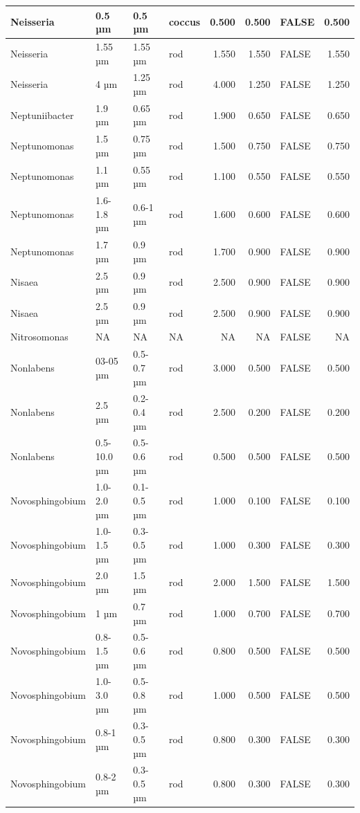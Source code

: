 \documentclass[
]{article}
\begin{document}
\begin{table}
\begin{tabular}{l|l|l|l|r|r|l|r}
\hline
Neisseria & 0.5 µm & 0.5 µm & coccus & 0.500 & 0.500 & FALSE & 0.500\\
\hline
Neisseria & 1.55 µm & 1.55 µm & rod & 1.550 & 1.550 & FALSE & 1.550\\
\hline
Neisseria & 4 µm & 1.25 µm & rod & 4.000 & 1.250 & FALSE & 1.250\\
\hline
Neptuniibacter & 1.9 µm & 0.65 µm & rod & 1.900 & 0.650 & FALSE & 0.650\\
\hline
Neptunomonas & 1.5 µm & 0.75 µm & rod & 1.500 & 0.750 & FALSE & 0.750\\
\hline
Neptunomonas & 1.1 µm & 0.55 µm & rod & 1.100 & 0.550 & FALSE & 0.550\\
\hline
Neptunomonas & 1.6-1.8 µm & 0.6-1 µm & rod & 1.600 & 0.600 & FALSE & 0.600\\
\hline
Neptunomonas & 1.7 µm & 0.9 µm & rod & 1.700 & 0.900 & FALSE & 0.900\\
\hline
Nisaea & 2.5 µm & 0.9 µm & rod & 2.500 & 0.900 & FALSE & 0.900\\
\hline
Nisaea & 2.5 µm & 0.9 µm & rod & 2.500 & 0.900 & FALSE & 0.900\\
\hline
Nitrosomonas & NA & NA & NA & NA & NA & FALSE & NA\\
\hline
Nonlabens & 03-05 µm & 0.5-0.7 µm & rod & 3.000 & 0.500 & FALSE & 0.500\\
\hline
Nonlabens & 2.5 µm & 0.2-0.4 µm & rod & 2.500 & 0.200 & FALSE & 0.200\\
\hline
Nonlabens & 0.5-10.0 µm & 0.5-0.6 µm & rod & 0.500 & 0.500 & FALSE & 0.500\\
\hline
Novosphingobium & 1.0-2.0 µm & 0.1-0.5 µm & rod & 1.000 & 0.100 & FALSE & 0.100\\
\hline
Novosphingobium & 1.0-1.5 µm & 0.3-0.5 µm & rod & 1.000 & 0.300 & FALSE & 0.300\\
\hline
Novosphingobium & 2.0 µm & 1.5 µm & rod & 2.000 & 1.500 & FALSE & 1.500\\
\hline
Novosphingobium & 1 µm & 0.7 µm & rod & 1.000 & 0.700 & FALSE & 0.700\\
\hline
Novosphingobium & 0.8-1.5 µm & 0.5-0.6 µm & rod & 0.800 & 0.500 & FALSE & 0.500\\
\hline
Novosphingobium & 1.0-3.0 µm & 0.5-0.8 µm & rod & 1.000 & 0.500 & FALSE & 0.500\\
\hline
Novosphingobium & 0.8-1 µm & 0.3-0.5 µm & rod & 0.800 & 0.300 & FALSE & 0.300\\
\hline
Novosphingobium & 0.8-2 µm & 0.3-0.5 µm & rod & 0.800 & 0.300 & FALSE & 0.300\\

\end{tabular}
\end{table}
\end{document}
